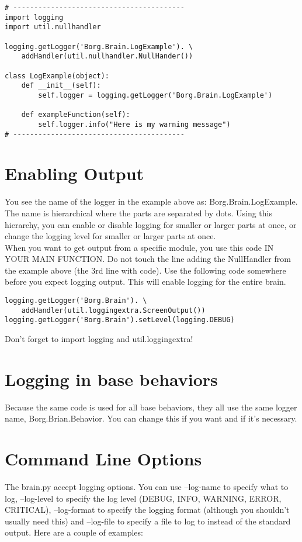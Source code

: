\documentclass[a4paper, 10pt, oneside]{article}
\begin{document}
\begin{lstlisting}
# -----------------------------------------
import logging
import util.nullhandler

logging.getLogger('Borg.Brain.LogExample'). \
    addHandler(util.nullhandler.NullHander())

class LogExample(object):
    def __init__(self):
        self.logger = logging.getLogger('Borg.Brain.LogExample')

    def exampleFunction(self):
        self.logger.info("Here is my warning message")
# -----------------------------------------
\end{lstlisting}


\section{Enabling Output}
You see the name of the logger in the example above as: Borg.Brain.LogExample.
The name is hierarchical where the parts are separated by dots. Using this
hierarchy, you can enable or disable logging for smaller or larger parts at
once, or change the logging level for smaller or larger parts at once.\\

When you want to get output from a specific module, you use this code IN YOUR
MAIN FUNCTION. Do not touch the line adding the NullHandler from the example
above (the 3rd line with code). Use the following code somewhere before you
expect logging output. This will enable logging for the entire brain. \\

\begin{lstlisting}
logging.getLogger('Borg.Brain'). \
    addHandler(util.loggingextra.ScreenOutput())
logging.getLogger('Borg.Brain').setLevel(logging.DEBUG)
\end{lstlisting}

Don't forget to import logging and util.loggingextra!

\section{Logging in base behaviors}
Because the same code is used for all base behaviors, they all use the same
logger name, Borg.Brian.Behavior. You can change this if you want and if it's
necessary.

\section{Command Line Options}
The brain.py accept logging options. You can use --log-name to specify what to
log, --log-level to specify the log level (DEBUG, INFO, WARNING, ERROR,
CRITICAL), --log-format to specify the logging format (although you shouldn't
usually need this) and --log-file to specify a file to log to instead of the
standard output. Here are a couple of examples: \\
\end{document}
